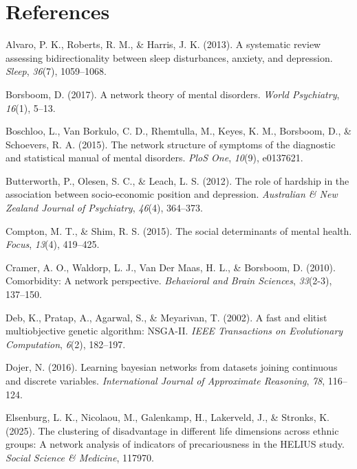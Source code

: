 \documentclass[
]{article}
\newlength{\cslhangindent}
\newenvironment{CSLReferences}[2] %
 {\begin{list}{}{%
  \setlength{\itemindent}{0pt}
  \setlength{\leftmargin}{0pt}
  \setlength{\parsep}{0pt}
  \ifodd #1
   \setlength{\leftmargin}{\cslhangindent}
   \setlength{\itemindent}{-1\cslhangindent}
  \fi
  \setlength{\itemsep}{#2\baselineskip}}}
 {\end{list}}
\begin{document}
\section{References}\label{references}

\label{refs}
\begin{CSLReferences}{1}{0}
Alvaro, P. K., Roberts, R. M., \& Harris, J. K. (2013). A systematic
review assessing bidirectionality between sleep disturbances, anxiety,
and depression. \emph{Sleep}, \emph{36}(7), 1059--1068.

Borsboom, D. (2017). A network theory of mental disorders. \emph{World
Psychiatry}, \emph{16}(1), 5--13.

Boschloo, L., Van Borkulo, C. D., Rhemtulla, M., Keyes, K. M., Borsboom,
D., \& Schoevers, R. A. (2015). The network structure of symptoms of the
diagnostic and statistical manual of mental disorders. \emph{PloS One},
\emph{10}(9), e0137621.

Butterworth, P., Olesen, S. C., \& Leach, L. S. (2012). The role of
hardship in the association between socio-economic position and
depression. \emph{Australian \& New Zealand Journal of Psychiatry},
\emph{46}(4), 364--373.

Compton, M. T., \& Shim, R. S. (2015). The social determinants of mental
health. \emph{Focus}, \emph{13}(4), 419--425.

Cramer, A. O., Waldorp, L. J., Van Der Maas, H. L., \& Borsboom, D.
(2010). Comorbidity: A network perspective. \emph{Behavioral and Brain
Sciences}, \emph{33}(2-3), 137--150.

Deb, K., Pratap, A., Agarwal, S., \& Meyarivan, T. (2002). A fast and
elitist multiobjective genetic algorithm: NSGA-II. \emph{IEEE
Transactions on Evolutionary Computation}, \emph{6}(2), 182--197.

Dojer, N. (2016). Learning bayesian networks from datasets joining
continuous and discrete variables. \emph{International Journal of
Approximate Reasoning}, \emph{78}, 116--124.

Elsenburg, L. K., Nicolaou, M., Galenkamp, H., Lakerveld, J., \&
Stronks, K. (2025). The clustering of disadvantage in different life
dimensions across ethnic groups: A network analysis of indicators of
precariousness in the HELIUS study. \emph{Social Science \& Medicine},
117970.


\end{CSLReferences}
\end{document}
